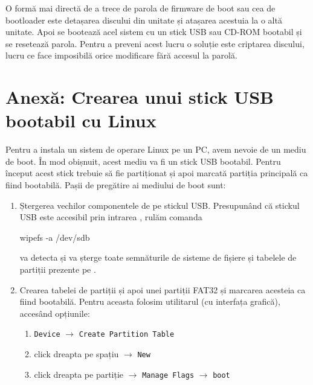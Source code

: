 O formă mai directă de a trece de parola de firmware de boot sau cea de
bootloader este detașarea discului din unitate și atașarea acestuia la o altă
unitate. Apoi se bootează acel sistem cu un stick USB sau CD-ROM bootabil și se
resetează parola. Pentru a preveni acest lucru o soluție este criptarea
discului, lucru ce face imposibilă orice modificare fără accesul la parolă.

\section{Anexă: Crearea unui stick USB bootabil cu Linux}
\label{sec:boot:usb-linux}

Pentru a instala un sistem de operare Linux pe un PC, avem nevoie de un mediu de
boot. În mod obișnuit, acest mediu va fi un stick USB bootabil. Pentru început
acest stick trebuie să fie partiționat și apoi marcată partiția principală ca
fiind bootabilă. Pașii de pregătire ai mediului de boot sunt:

\begin{enumerate}
	\item Ștergerea vechilor componentele de pe stickul USB. Presupunând că
          stickul USB este accesibil prin intrarea , rulăm
		comanda

\begin{screen}
wipefs -a /dev/sdb
\end{screen}

         va detecta și va șterge toate semnăturile de sisteme de fișiere
	și tabelele de partiții prezente pe .

	\item Crearea tabelei de partiții și apoi unei partiții FAT32 și
		marcarea acesteia ca fiind bootabilă. Pentru aceasta folosim
                utilitarul  (cu interfața grafică), accesând opțiunile:
                \begin{enumerate}
                  \item \texttt{Device} $\rightarrow$ \texttt{Create Partition Table}
                  \item click dreapta pe spațiu $\rightarrow$ \texttt{New}
                  \item click dreapta pe partiție $\rightarrow$ \texttt{Manage Flags} $\rightarrow$ \texttt{boot}
                \end{enumerate}

\end{enumerate}


